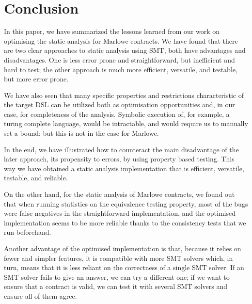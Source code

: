 \documentclass[english,runningheads]{llncs}
\begin{document}
\section{Conclusion}

In this paper, we have summarized the lessons learned from our work
on optimising the static analysis for Marlowe contracts. We have found
that there are two clear approaches to static analysis using SMT,
both have advantages and disadvantages. One is less error prone and
straightforward, but inefficient and hard to test; the other approach
is much more efficient, versatile, and testable, but more error prone.

We have also seen that many specific properties and restrictions characteristic
of the target DSL can be utilized both as optimisation opportunities
and, in our case, for completeness of the analysis. Symbolic execution
of, for example, a turing complete language, would be intractable,
and would require us to manually set a bound; but this is not in the
case for Marlowe.

In the end, we have illustrated how to counteract the main disadvantage
of the later approach, its propensity to errors, by using property
based testing. This way we have obtained a static analysis implementation
that is efficient, versatile, testable, and reliable.

On the other hand, for the static analysis of Marlowe contracts, we
found out that when running statistics on the equivalence testing
property, most of the bugs were false negatives in the straightforward
implementation, and the optimised implementation seems to be more
reliable thanks to the consistency tests that we run beforehand.

Another advantage of the optimised implementation is that, because
it relies on fewer and simpler features, it is compatible with more
SMT solvers which, in turn, means that it is less reliant on the
correctness of a single SMT solver. If an SMT solver fails to give
an answer, we can try a different one; if we want to ensure that a
contract is valid, we can test it with several SMT solvers and ensure
all of them agree. 



\end{document}
